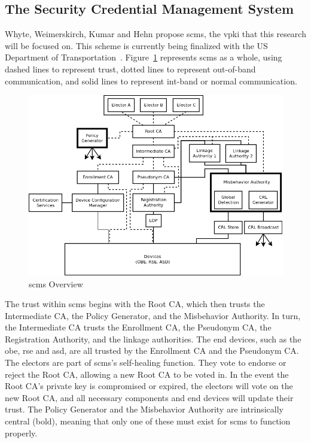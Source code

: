 \documentclass {article}
\begin{document}
\subsection{The Security Credential Management System}
Whyte, Weimerskirch, Kumar and Hehn propose \gls{scms}, the \gls{vpki} that this research will be focused on. This scheme is currently being finalized with the US Department of Transportation~\autocite{brecht_security_2018}. Figure~\ref{scms_overview} represents \gls{scms} as a whole, using dashed lines to represent trust, dotted lines to represent out-of-band communication, and solid lines to represent int-band or normal communication. 
\begin{figure}[!ht]
	\centering
	\includegraphics[width=.8\textwidth]{images/scms_diagram.png}
	\caption{\gls{scms} Overview}
	\label{scms_overview}
\end{figure}
The trust within \gls{scms} begins with the Root CA, which then trusts the Intermediate CA, the Policy Generator, and the Misbehavior Authority. In turn, the Intermediate CA trusts the Enrollment CA, the Pseudonym CA, the Registration Authority, and the linkage authorities. The end devices, such as the \gls{obe}, \gls{rse} and \gls{asd}, are all trusted by the Enrollment CA and the Pseudonym CA. The electors are part of \gls{scms}'s self-healing function. They vote to endorse or reject the Root CA, allowing a new Root CA to be voted in. In the event the Root CA's private key is compromised or expired, the electors will vote on the new Root CA, and all necessary components and end devices will update their trust. The Policy Generator and the Misbehavior Authority are intrinsically central (bold), meaning that only one of these must exist for \gls{scms} to function properly.
\end{document}
